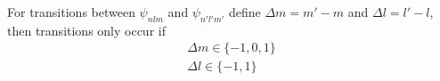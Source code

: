 

\vspace*{\fill}
\centering

For transitions between $\psi_{nlm}$ and $\psi_{n'l'm'}$ define $\Delta m = m'-m$ and $\Delta l = l' - l$, then transitions only occur if
\begin{align*}
   \Delta m \in \{ -1,0,1 \} \\
   \Delta l \in \{ -1,1 \} 
\end{align*}

\centering
\vspace*{\fill}


